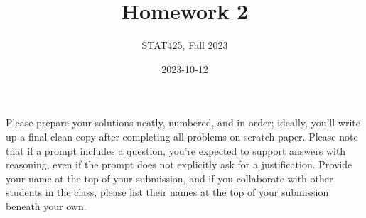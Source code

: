 \documentclass[
  letterpaper,
  DIV=11,
  numbers=noendperiod]{scrartcl}
\title{Homework 2}
\author{STAT425, Fall 2023}
\date{2023-10-12}
\begin{document}
\maketitle
\pagestyle{fancy}  

\ifdefined\Shaded\renewenvironment{Shaded}{\begin{tcolorbox}[frame hidden, boxrule=0pt, breakable, enhanced, interior hidden, borderline west={3pt}{0pt}{shadecolor}, sharp corners]}{\end{tcolorbox}}\fi

Please prepare your solutions neatly, numbered, and in order; ideally,
you'll write up a final clean copy after completing all problems on
scratch paper. Please note that if a prompt includes a question, you're
expected to support answers with reasoning, even if the prompt does not
explicitly ask for a justification. Provide your name at the top of your
submission, and if you collaborate with other students in the class,
please list their names at the top of your submission beneath your own.
\end{document}
